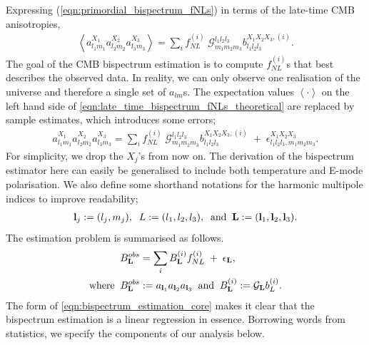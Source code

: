 Expressing (\ref{eqn:primordial_bispectrum_fNLs}) in terms of the late-time CMB anisotropies,
\begin{align}
	\left< a_{l_1 m_1}^{X_1} a_{l_2 m_2}^{X_2} a_{l_3 m_3}^{X_3}  \right> = \sum_i f^{(i)}_{NL} \; \mathcal{G}^{l_1 l_2 l_3}_{m_1 m_2 m_3} b^{X_1 X_2 X_3, (i)}_{l_1 l_2 l_3}. \label{eqn:late_time_bispectrum_fNLs_theoretical}
\end{align}
The goal of the CMB bispectrum estimation is to compute $f^{(i)}_{NL}$s that best describes the observed data. In reality, we can only observe one realisation of the universe and therefore a single set of $a_{lm}$s. The expectation values $\left< \cdot \right>$ on the left hand side of \eqref{eqn:late_time_bispectrum_fNLs_theoretical} are replaced by sample estimates, which introduces some errors;
\begin{align}
	a_{l_1 m_1}^{X_1} a_{l_2 m_2}^{X_2} a_{l_3 m_3}^{X_3} = \sum_i  f^{(i)}_{NL} \; \mathcal{G}^{l_1 l_2 l_3}_{m_1 m_2 m_3} b^{X_1 X_2 X_3, (i)}_{l_1 l_2 l_3} \;+\; \epsilon^{X_1 X_2 X_3}_{l_1 l_2 l_3, m_1 m_2 m_3}. \label{eqn:late_time_bispectrum_fNLs_sample}
\end{align}
For simplicity, we drop the $X_j$'s from now on. The derivation of the bispectrum estimator here can easily be generalised to include both temperature and E-mode polarisation. We also define some shorthand notations for the harmonic multipole indices to improve readability;
\begin{align}
	\mathbf{l}_j:=(l_j,m_j), \;\; L:=(l_1,l_2,l_3), \;\; \text{and} \;\; \mathbf{L}:=(\mathbf{l}_1, \mathbf{l}_2, \mathbf{l}_3).
\end{align}
The estimation problem is summarised as follows.
\begin{align}
	&B^{obs}_\mathbf{L} = \sum_i B^{(i)}_\mathbf{L} f^{(i)}_{NL}  \;+\; \epsilon_\mathbf{L}, \label{eqn:bispectrum_estimation_core}\\
	\text{where} \;\; &B^{obs}_\mathbf{L} := a_{\mathbf{l}_1} a_{\mathbf{l}_2} a_{\mathbf{l}_3} \;\; \text{and} \;\; B^{(i)}_\mathbf{L} := \mathcal{G}_\mathbf{L} b^{(i)}_L.
\end{align}
The form of \eqref{eqn:bispectrum_estimation_core} makes it clear that the bispectrum estimation is a linear regression in essence. Borrowing words from statistics, we specify the components of our analysis below.
